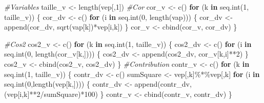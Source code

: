 \documentclass[
]{article}
\newenvironment{Shaded}{\begin{snugshade}}{\end{snugshade}}
\newcommand{\CommentTok}[1]{\textcolor[rgb]{0.56,0.35,0.01}{\textit{#1}}}
\newcommand{\ControlFlowTok}[1]{\textcolor[rgb]{0.13,0.29,0.53}{\textbf{#1}}}
\newcommand{\DecValTok}[1]{\textcolor[rgb]{0.00,0.00,0.81}{#1}}
\newcommand{\FunctionTok}[1]{\textcolor[rgb]{0.00,0.00,0.00}{#1}}
\newcommand{\NormalTok}[1]{#1}
\newcommand{\OtherTok}[1]{\textcolor[rgb]{0.56,0.35,0.01}{#1}}
\newcommand{\SpecialCharTok}[1]{\textcolor[rgb]{0.00,0.00,0.00}{#1}}
\begin{document}
\begin{Shaded}
\begin{Highlighting}[]
    \CommentTok{\#Variables}
\NormalTok{  taille\_v }\OtherTok{\textless{}{-}} \FunctionTok{length}\NormalTok{(vep[,}\DecValTok{1}\NormalTok{])}
      \CommentTok{\#Cor}
\NormalTok{  cor\_v }\OtherTok{\textless{}{-}} \FunctionTok{c}\NormalTok{()}
  \ControlFlowTok{for}\NormalTok{ (k }\ControlFlowTok{in} \FunctionTok{seq.int}\NormalTok{(}\DecValTok{1}\NormalTok{, taille\_v)) \{}
\NormalTok{    cor\_dv }\OtherTok{\textless{}{-}} \FunctionTok{c}\NormalTok{()}
    \ControlFlowTok{for}\NormalTok{ (i }\ControlFlowTok{in} \FunctionTok{seq.int}\NormalTok{(}\DecValTok{0}\NormalTok{, }\FunctionTok{length}\NormalTok{(vap))) \{}
\NormalTok{      cor\_dv }\OtherTok{\textless{}{-}} \FunctionTok{append}\NormalTok{(cor\_dv, }\FunctionTok{sqrt}\NormalTok{(vap[k])}\SpecialCharTok{*}\NormalTok{vep[i,k])}
\NormalTok{    \}}
\NormalTok{    cor\_v }\OtherTok{\textless{}{-}} \FunctionTok{cbind}\NormalTok{(cor\_v, cor\_dv)}
\NormalTok{  \}}
  
    \CommentTok{\#Cos2}
\NormalTok{  cos2\_v }\OtherTok{\textless{}{-}} \FunctionTok{c}\NormalTok{()}
  \ControlFlowTok{for}\NormalTok{ (k }\ControlFlowTok{in} \FunctionTok{seq.int}\NormalTok{(}\DecValTok{1}\NormalTok{, taille\_v)) \{}
\NormalTok{    cos2\_dv }\OtherTok{\textless{}{-}} \FunctionTok{c}\NormalTok{()}
    \ControlFlowTok{for}\NormalTok{ (i }\ControlFlowTok{in} \FunctionTok{seq.int}\NormalTok{(}\DecValTok{0}\NormalTok{, }\FunctionTok{length}\NormalTok{(cor\_v[k,]))) \{}
\NormalTok{      cos2\_dv }\OtherTok{\textless{}{-}} \FunctionTok{append}\NormalTok{(cos2\_dv, cor\_v[k,i]}\SpecialCharTok{**}\DecValTok{2}\NormalTok{)}
\NormalTok{    \}}
\NormalTok{    cos2\_v }\OtherTok{\textless{}{-}} \FunctionTok{cbind}\NormalTok{(cos2\_v, cos2\_dv)}
\NormalTok{  \}}
    \CommentTok{\#Contribution}
\NormalTok{  contr\_v }\OtherTok{\textless{}{-}} \FunctionTok{c}\NormalTok{()}
  \ControlFlowTok{for}\NormalTok{ (k }\ControlFlowTok{in} \FunctionTok{seq.int}\NormalTok{(}\DecValTok{1}\NormalTok{, taille\_v)) \{}
\NormalTok{    contr\_dv }\OtherTok{\textless{}{-}} \FunctionTok{c}\NormalTok{()}
\NormalTok{    sumSquare }\OtherTok{\textless{}{-}}\NormalTok{ vep[,k]}\SpecialCharTok{\%*\%}\NormalTok{vep[,k]}
    \ControlFlowTok{for}\NormalTok{ (i }\ControlFlowTok{in} \FunctionTok{seq.int}\NormalTok{(}\DecValTok{0}\NormalTok{,}\FunctionTok{length}\NormalTok{(vep[k,]))) \{}
\NormalTok{      contr\_dv }\OtherTok{\textless{}{-}} \FunctionTok{append}\NormalTok{(contr\_dv, (vep[i,k]}\SpecialCharTok{**}\DecValTok{2}\SpecialCharTok{/}\NormalTok{sumSquare)}\SpecialCharTok{*}\DecValTok{100}\NormalTok{)}
\NormalTok{    \}}
\NormalTok{    contr\_v }\OtherTok{\textless{}{-}} \FunctionTok{cbind}\NormalTok{(contr\_v, contr\_dv)}
\NormalTok{  \}}
 


\end{Highlighting}
\end{Shaded}
\end{document}
